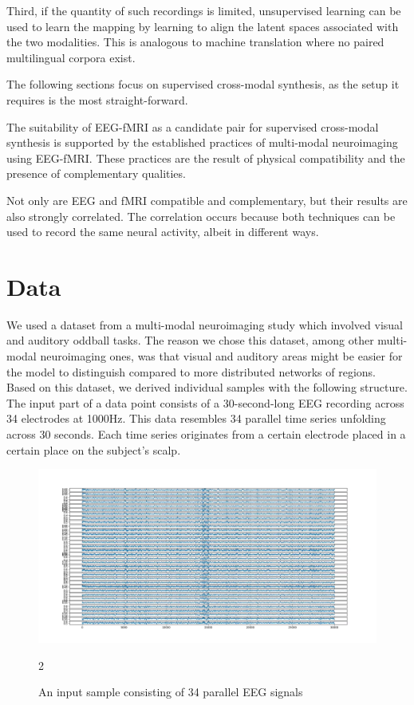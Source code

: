 \documentclass{article}
\begin{document}
Third, if the quantity of such recordings is limited, unsupervised learning can be used to learn the mapping by learning to align the latent spaces associated with the two modalities. This is analogous to machine translation where no paired multilingual corpora exist.

The following sections focus on supervised cross-modal synthesis, as the setup it requires is the most straight-forward.

The suitability of EEG-fMRI as a candidate pair for supervised cross-modal synthesis is supported by the established practices of multi-modal neuroimaging using EEG-fMRI. These practices are the result of physical compatibility and the presence of complementary qualities.

Not only are EEG and fMRI compatible and complementary, but their results are also strongly correlated. The correlation occurs because both techniques can be used to record the same neural activity, albeit in different ways.

\section{Data}

We used a dataset from a multi-modal neuroimaging study which involved visual and auditory oddball tasks. The reason we chose this dataset, among other multi-modal neuroimaging ones, was that visual and auditory areas might be easier for the model to distinguish compared to more distributed networks of regions. Based on this dataset, we derived individual samples with the following structure. The input part of a data point consists of a 30-second-long EEG recording across 34 electrodes at 1000Hz. This data resembles 34 parallel time series unfolding across 30 seconds. Each time series originates from a certain electrode placed in a certain place on the subject's scalp.

\begin{figure}[h]
    \centering
    \includegraphics[width=\textwidth]{eeg.png}
    \caption{An input sample consisting of 34 parallel EEG signals}
2\end{figure}
\end{document}
